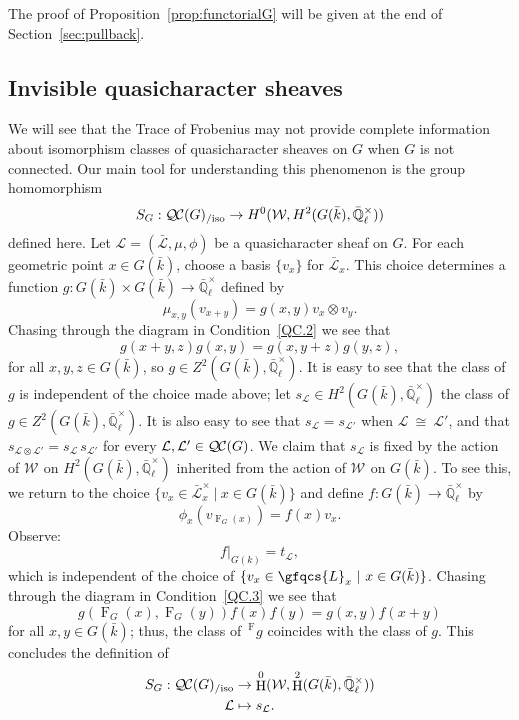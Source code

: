 \documentclass{amsart}
\theoremstyle{plain}
\theoremstyle{definition}
\theoremstyle{remark}
\newcommand{\EE}{\mathbb{\bar Q}_\ell}
\newcommand{\bFq}{\bar{k}}
\newcommand{\Fq}{k}
\newcommand{\EEx}{\EE^\times}
\newcommand{\Weil}[1]{\mathcal{W}_{#1}}
\newcommand{\Frob}[1]{\operatorname{F}_{#1}}
\DeclareMathOperator{\Hh}{H}
\newcommand{\tq}{{\ \vert\ }}
\newcommand{\iso}{{\ \cong\ }}
\newcommand{\qcs}[1]{{\mathcal{#1}}}
\newcommand{\gqcs}[1]{{\mathcal{\bar #1}}}
\newcommand{\QC}{{\mathcal{Q\hskip-0.8pt C}}}
\newcommand{\QCiso}[1]{\QC(#1)_{/\text{iso}}}
\begin{document}
The proof of Proposition~\ref{prop:functorialG} will be given at the end of Section~\ref{sec:pullback}.



\subsection{Invisible quasicharacter sheaves}\label{sec:invisible}

We will see that the Trace of Frobenius may not provide complete
information about isomorphism classes of quasicharacter sheaves on $G$ when $G$ is not connected.
Our main tool for understanding this phenomenon is the group homomorphism
\begin{equation}\label{2cocycle}
S_{G}: \QCiso{G} \to H^0(\Weil{},H^2(G(\bFq),\EEx))
\end{equation}
defined here.
Let $\qcs{L} = (\gqcs{L},\mu,\phi)$ be a quasicharacter sheaf on $G$.
For each geometric point $x\in G(\bFq)$, choose a basis $\{ v_x \}$ for $\gqcs{L}_x$.
This choice determines a function $g : G(\bFq)\times G(\bFq) \to \EEx$ defined by
\[
\mu_{x,y}(v_{x+y}) = g(x,y) v_x \otimes v_y.
\]
Chasing through the diagram in Condition~\ref{QC.2} we see that
\[
g(x+y,z) g(x,y) = g(x,y+z) g(y,z),
\]
for all $x,y,z\in G(\bFq)$, so $g \in Z^2(G(\bFq),\EEx)$.
It is easy to see that the class of $g$ is independent of the choice made above;
let $s_\mathcal{L} \in H^2(G(\bFq),\EEx)$ the class of $g\in Z^2(G(\bFq),\EEx)$.
It is also easy to see that $s_\mathcal{L} = s_\mathcal{L'}$ when $\qcs{L} \iso \qcs{L'}$, and that $s_{\qcs{L}\otimes \qcs{L'}} = s_{\qcs{L}} \, s_\qcs{L'}$
for every $\qcs{L}, \qcs{L'} \in \QC(G)$.
We claim that $s_\qcs{L}$ is fixed by the action of $\Weil{}$ on $H^2(G(\bFq),\EEx)$
inherited from the action of $\Weil{}$ on $G(\bFq)$.
To see this, we return to the choice $\{ v_x \in \gqcs{L}_x^\times \tq x\in G(\bFq) \}$
and define $f : G(\bFq) \to \EEx$ by
\[
\phi_x(v_{\Frob{G}(x)}) = f(x) v_x.
\]
Observe:
\begin{equation}\label{ftot}
f\vert_{G(\Fq)} = t_\qcs{L},
\end{equation}
which is independent of the choice of $\{ v_x \in \gfqcs{L}_x \tq x\in G(\bFq)\}$.
Chasing through the diagram in Condition~\ref{QC.3} we see that
\begin{equation}\label{nohom}
g(\Frob{G}(x),\Frob{G}(y)) f(x) f(y)  = g(x,y) f(x+y)
\end{equation}
for all $x,y \in G(\bFq)$; thus, the class of $\,^{\Frob{}}g$ coincides with the class of $g$.
This concludes the definition of
\begin{align*}
S_G: \QCiso{G} &\to \Hh^0(\Weil{},\Hh^2(G(\bFq),\EEx))\\
\qcs{L} &\mapsto s_{\qcs{L}}.
\end{align*}
\end{document}
